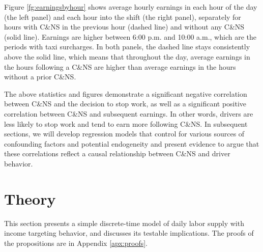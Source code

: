 \documentclass[reviewmode]{restat}
\begin{document}
Figure \ref{fg:earningsbyhour} shows average hourly earnings in each hour of the day (the left panel) and
each hour into the shift (the right panel), separately for hours with C\&NS in the previous hour 
(dashed line) and without any C\&NS (solid line). Earnings are higher between 6:00 p.m. and 10:00 a.m.,
which are the periods with taxi surcharges. In both panels, the dashed line stays consistently 
above the solid line, which means that throughout the day, average earnings in the hours following a 
C\&NS are higher than  average earnings in the hours without a prior C\&NS.

The above statistics and figures demonstrate a significant negative correlation between C\&NS and the 
decision to stop work, as well as a significant positive correlation between C\&NS and subsequent earnings.
In other words, drivers are less likely to stop work and tend to earn more following C\&NS. In subsequent
sections, we will develop regression models  that control for various sources of confounding factors and
potential endogeneity and present evidence to argue that these correlations reflect a causal relationship
between C\&NS and driver behavior.

\section{Theory}
\label{sec:theory}

This section presents a simple discrete-time model of daily labor supply with income targeting behavior,
and discusses its testable implications. The proofs of the propositions are in Appendix \ref{apx:proofs}.
\end{document}
